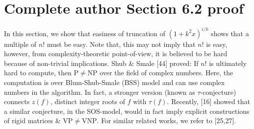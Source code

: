 \section*{Complete author Section 6.2 proof}
In this section, we show that easiness of truncation of $(1+k^2x)^{i/k}$ shows that a multiple of $n!$ must be easy. Note that, this may not imply that $n!$ is easy, however, from complexity-theoretic point-of-view, it is believed to be hard because of non-trivial implications. Shub \& Smale [44] proved: If $n!$ is ultimately hard to compute, then $\mathrm P\ne\mathrm{NP}$ over the field of complex numbers. Here, the computation is over Blum-Shub-Smale (BSS) model and can use complex numbers in the algorithm. In fact, a stronger version (known as $\tau$-conjecture) connects $z(f)$, distinct integer roots of $f$ with $\tau(f)$. Recently, [16] showed that a similar conjecture, in the SOS-model, would in fact imply explicit constructions of rigid matrices \& $\mathrm{VP}\ne\mathrm{VNP}$. For similar related works, we refer to [25,27].
